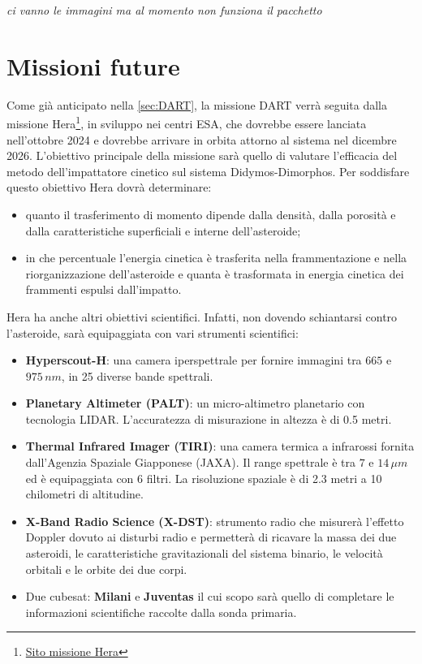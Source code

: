 \documentclass[a4paper,11pt,openright]{book}
\begin{document}
{\footnotesize\textit{ci vanno le immagini ma al momento non funziona il pacchetto}}

\section{Missioni future}
Come già anticipato nella \cref{sec:DART}, la missione DART verrà seguita dalla missione Hera\footnote{\href{https://www.heramission.space/}{Sito missione Hera}}, in sviluppo nei centri ESA, che dovrebbe essere lanciata nell'ottobre 2024 e dovrebbe arrivare in orbita attorno al sistema nel dicembre 2026. L'obiettivo principale della missione sarà quello di valutare l'efficacia del metodo dell'impattatore cinetico sul sistema Didymos-Dimorphos. Per soddisfare questo obiettivo Hera dovrà determinare: 
\begin{itemize}
    \item quanto il trasferimento di momento dipende dalla densità, dalla porosità e dalla caratteristiche superficiali e interne dell'asteroide;
    \item in che percentuale l'energia cinetica è trasferita nella frammentazione e nella riorganizzazione dell'asteroide e quanta è trasformata in energia cinetica dei frammenti espulsi dall'impatto.
\end{itemize}
Hera ha anche altri obiettivi scientifici. Infatti, non dovendo schiantarsi contro l'asteroide, sarà equipaggiata con vari strumenti scientifici:
\begin{itemize}
    \item \textbf{Hyperscout-H}: una camera iperspettrale per fornire immagini tra $665$ e $975\,nm$, in 25 diverse bande spettrali.
    \item \textbf{Planetary Altimeter (PALT)}: un micro-altimetro planetario con tecnologia LIDAR. L'accuratezza di misurazione in altezza è di 0.5 metri.
    \item \textbf{Thermal Infrared Imager (TIRI)}: una camera termica a infrarossi fornita dall'Agenzia Spaziale Giapponese (JAXA). Il range spettrale è tra $7$ e $14\,\mu m$ ed è equipaggiata con 6 filtri. La risoluzione spaziale è di 2.3 metri a 10 chilometri di altitudine.
    \item \textbf{X-Band Radio Science (X-DST)}: strumento radio che misurerà l'effetto Doppler dovuto ai disturbi radio e permetterà di ricavare la massa dei due asteroidi, le caratteristiche gravitazionali del sistema binario, le velocità orbitali e le orbite dei due corpi.
    \item Due cubesat: \textbf{Milani} e \textbf{Juventas} il cui scopo sarà quello di completare le informazioni scientifiche raccolte dalla sonda primaria.
\end{itemize}
\end{document}
